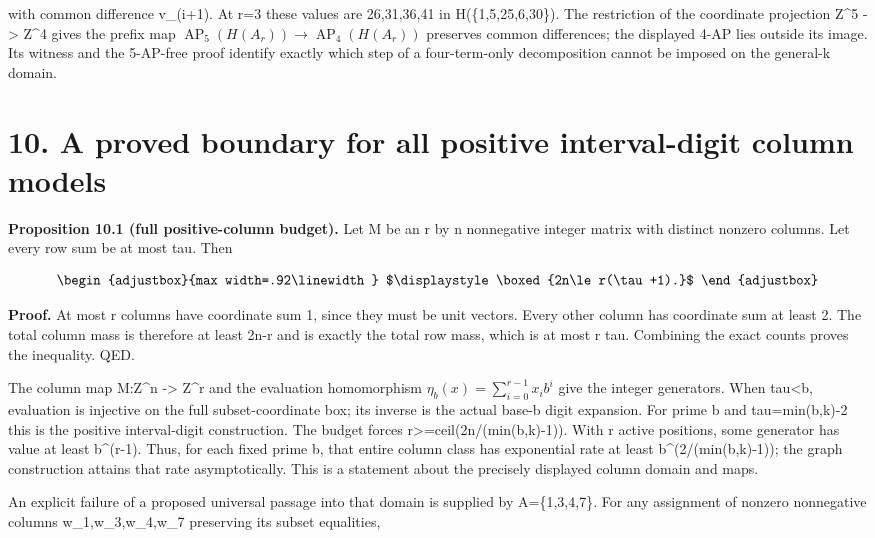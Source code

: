 with common difference v\_(i+1). At r=3 these values are 26,31,36,41 in H(\{1,5,25,6,30\}). The restriction of the coordinate projection Z\^{}5 -\textgreater{} Z\^{}4 gives the prefix map \(\operatorname{AP}_5(H(A_r))\to\operatorname{AP}_4(H(A_r))\) preserves common differences; the displayed 4-AP lies outside its image. Its witness and the 5-AP-free proof identify exactly which step of a four-term-only decomposition cannot be imposed on the general-k domain.

\section{10. A proved boundary for all positive interval-digit column models}\label{n03-a-proved-boundary-for-all-positive-interval-digit-column-models}

\textbf{Proposition 10.1 (full positive-column budget).} Let M be an r by n nonnegative integer matrix with distinct nonzero columns. Let every row sum be at most tau. Then

\[
\begin{adjustbox}{max width=.92\linewidth}
$\displaystyle \boxed{2n\le r(\tau+1).}$
\end{adjustbox}
\]

\textbf{Proof.} At most r columns have coordinate sum 1, since they must be unit vectors. Every other column has coordinate sum at least 2. The total column mass is therefore at least 2n-r and is exactly the total row mass, which is at most r tau. Combining the exact counts proves the inequality. QED.

The column map M:Z\^{}n -\textgreater{} Z\^{}r and the evaluation homomorphism \(\eta_b(x)=\sum_{i=0}^{r-1}x_i b^i\) give the integer generators. When tau\textless b, evaluation is injective on the full subset-coordinate box; its inverse is the actual base-b digit expansion. For prime b and tau=min(b,k)-2 this is the positive interval-digit construction. The budget forces r\textgreater=ceil(2n/(min(b,k)-1)). With r active positions, some generator has value at least b\^{}(r-1). Thus, for each fixed prime b, that entire column class has exponential rate at least b\^{}(2/(min(b,k)-1)); the graph construction attains that rate asymptotically. This is a statement about the precisely displayed column domain and maps.

An explicit failure of a proposed universal passage into that domain is supplied by A=\{1,3,4,7\}. For any assignment of nonzero nonnegative columns w\_1,w\_3,w\_4,w\_7 preserving its subset equalities,

